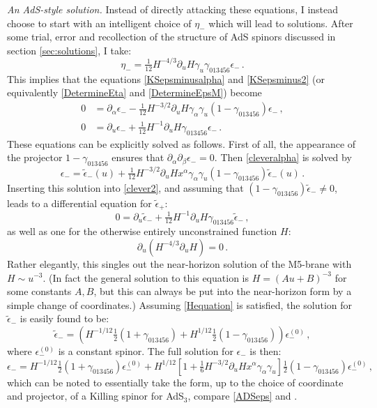 \documentclass[11pt]{article}
\newcommand{\be}{\begin{equation}}
\newcommand{\ee}{\end{equation}}
\newcommand{\epsc}{\epsilon^{(0)}}
\numberwithin{equation}{section}
\begin{document}
{{\vspace{1em}
\noindent \emph{An AdS-style solution.}
Instead of directly attacking these equations, I instead choose to start with an intelligent choice of $\eta_-$ which will lead to solutions.
After some trial, error and recollection of the structure of AdS spinors discussed in section \ref{sec:solutions}, I take:
\be
\eta_- = \tfrac{1}{12} H^{-4/3} \partial_u H \gamma_u \gamma_{013456} \epsilon_- \,.
\label{clevereta}
\ee
This implies that the equations \eqref{KSepsminusalpha} and \eqref{KSepsminus2} (or equivalently \eqref{DetermineEta} and \eqref{DetermineEpsM}) become
\begin{subequations}\label{someclevereqns}
\begin{align}
0 & = \partial_\alpha \epsilon_- - \tfrac{1}{12} H^{-3/2} \partial_u H \gamma_\alpha \gamma_u ( 1 - \gamma_{013456} ) \epsilon_- \,,
\label{cleveralpha}
\\[4pt]
0 & = \partial_u \epsilon_- + \tfrac{1}{12} H^{-1} \partial_u H \gamma_{013456} \epsilon_- \,.
\label{clever2}
\end{align} 
\end{subequations}
These equations can be explicitly solved as follows.
First of all, the appearance of the projector $1-\gamma_{013456}$ ensures that $\partial_\alpha \partial_\beta \epsilon_- = 0$.
Then \eqref{cleveralpha} is solved by 
\be
\epsilon_- = \tilde \epsilon_-(u) + \tfrac{1}{12} H^{-3/2} \partial_u H x^\alpha \gamma_\alpha \gamma_u (1 - \gamma_{013456} ) \tilde \epsilon_-(u) \,.
\ee
Inserting this solution into \eqref{clever2}, and
assuming that $(1-\gamma_{013456})\tilde \epsilon_- \neq 0$, leads to a differential equation for $\tilde \epsilon_+$:
\be
0  = \partial_u \tilde \epsilon_- + \tfrac{1}{12} H^{-1} \partial_u H \gamma_{013456} \tilde \epsilon_- \,,
\ee
as well as one for the otherwise entirely unconstrained function $H$:
\be
\partial_u (H^{-4/3} \partial_u H ) = 0 \,.
\label{Hequation}
\ee
Rather elegantly, this singles out the near-horizon solution of the M5-brane with $H \sim u^{-3}$. (In fact the general solution to this equation is $H = ( A u + B)^{-3}$ for some constants $A,B$, but this can always be put into the near-horizon form by a simple change of coordinates.)
Assuming \eqref{Hequation} is satisfied, the solution for $\tilde \epsilon_-$ is easily found to be:
\be
\tilde \epsilon_- = \left( H^{-1/12} \tfrac12 ( 1 +  \gamma_{013456} ) + H^{1/12} \tfrac12 ( 1 -  \gamma_{013456} ) \right) \epsc_-\,,
\ee
where $\epsc_-$ is a constant spinor.
The full solution for $\epsilon_-$ is then: 
\be
\epsilon_- = 
 H^{-1/12} \tfrac12 ( 1 +  \gamma_{013456} ) \epsc_-
+ H^{1/12} \left[
1 + \tfrac{1}{6} H^{-3/2} \partial_u H  x^\alpha \gamma_\alpha \gamma_u 
\right]\tfrac12 ( 1 - \gamma_{013456} )\epsc_-\,,
\label{epsminusSOLUTION}
\ee
which can be noted to essentially take the form, up to the choice of coordinate and projector, of  a Killing spinor for AdS${}_3$, compare \eqref{ADSeps} and \cite{Lu:1998nu}.

}}
\end{document}
